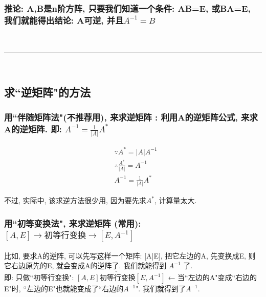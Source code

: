 \documentclass[UTF8]{ctexart}
\begin{document}
\subsubsection{推论: A,B是n阶方阵, 只要我们知道一个条件: AB=E, 或BA=E, 我们就能得出结论: A可逆, 并且$A^{-1}=B$ }



~\\
\hrule
~\\

\subsection{求``逆矩阵"的方法}


\subsubsection{用``伴随矩阵法"(不推荐用), 来求逆矩阵 : 利用A的逆矩阵公式, 来求A的逆矩阵. 即:  $	A^{-1}=\frac{1}{|A|}A^*	$ }

\begin{align*}
	& \because A^{\ast} = |A| A^{-1} \\
	& \therefore \frac{A^{\ast}}{|A| } = A^{-1} \\
	&
	\boxed{
		A^{-1}  =  \frac{1}{|A| } A^{\ast}
	}
\end{align*}

不过, 实际中, 该求逆方法很少用, 因为要先求$A^*$, 计算量太大. \\




\subsubsection{用``初等变换法", 来求逆矩阵 (常用): $	[ A,E] →\text{初等行变换} →[E,A^{-1}]	$ }
	
	比如, 要求A的逆阵, 可以先写这样一个矩阵: [A|E],  把它左边的A, 先变换成E, 则它右边原先的E, 就会变成A的逆阵了. 我们就能得到 $A^{-1}$ 了. \\
	
	
	即: 只做``初等行变换": $
	\left[ A,E \right] \underrightarrow{\text{初等行变换}}[E,A^{-1}]
	$ ← 当``左边的A"变成``右边的E"时, ``左边的E"也就能变成了``右边的$A^{-1}$". 我们就得到了$A^{-1}$. \\
	
\end{document}

